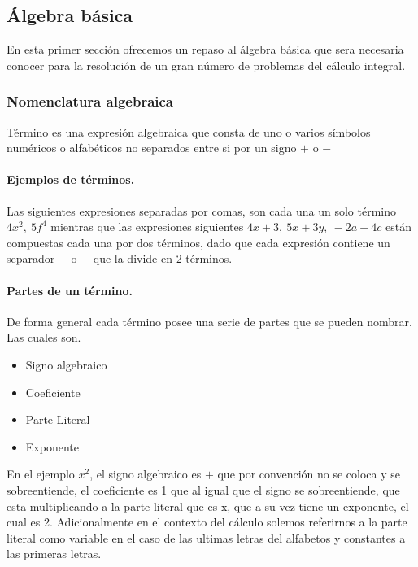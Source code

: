 \documentclass[11pt,letterpaper,oneside]{book}
\numberwithin{equation}{section}
\begin{document}
	\subsection{Álgebra básica}
	
	\par
	En esta primer sección ofrecemos un repaso al álgebra básica que sera necesaria conocer para la resolución de un gran número de problemas del cálculo integral.
	
	\subsubsection{Nomenclatura algebraica} 
	\begin{definición}
		Término es una expresión algebraica que consta de uno o varios símbolos numéricos o alfabéticos no separados entre si por un signo $+$ o $-$
	\end{definición}
	
	\paragraph{Ejemplos de términos.}
	
	Las siguientes expresiones separadas por comas, son cada una un solo término $4x^2, \ 5f^4$ mientras que las expresiones siguientes $4x+3, \ 5x+3y, \ -2a-4c$ están compuestas cada una por dos términos, dado que cada expresión contiene un separador $+$ o $-$ que la divide en 2 términos.
	
	\paragraph{Partes de un término.} De forma general cada término posee una serie de partes que se pueden nombrar. Las cuales son.
	\begin{itemize}
		\item Signo algebraico
		\item Coeficiente
		\item Parte Literal
		\item Exponente
	\end{itemize}
	
	\par
	En el ejemplo $x^2$, el signo algebraico es $+$ que por convención no se coloca y se sobreentiende, el coeficiente es 1 que al igual que el signo se sobreentiende, que esta multiplicando a la parte literal que es x, que a su vez tiene un exponente, el cual es 2. Adicionalmente en el contexto del cálculo solemos referirnos a la parte literal como variable en el caso de las ultimas letras del alfabetos y constantes a las primeras letras.
	
\end{document}
